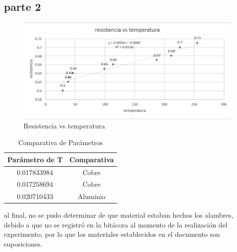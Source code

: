 \documentclass{article}
\begin{document}
\subsection*{parte 2}

\begin{figure}[H]
	\centering	
	\includegraphics[scale=0.5]{../imgs/tem.png}
	\caption{Resistencia vs temperatura}
	\label{fig:2}
\end{figure}

\begin{table}[ht]
    \centering
    \begin{tabular}{|c|c|}
    \hline
    Parámetro de T & Comparativa \\
    \hline
    0.017833984 & Cobre \\
    \hline
    0.017258694 & Cobre \\
    \hline
    0.020710433 & Aluminio \\
    \hline
    \end{tabular}
    \caption{Comparativa de Parámetros}
    \label{tabla:comparativa}
\end{table}

al final, no se pudo determinar de que material estaban hechos los alambres, debido a que no se registró en la bitácora al momento de la realización del experimento, por lo que los materiales establecidos en el documento son suposiciones.
\end{document}
